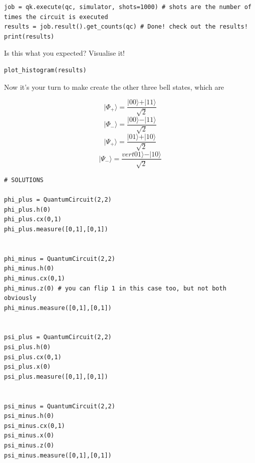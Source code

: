 \documentclass{beamer}
\begin{document}
\begin{frame}
\begin{verbatim}
job = qk.execute(qc, simulator, shots=1000) # shots are the number of times the circuit is executed
results = job.result().get_counts(qc) # Done! check out the results!
print(results)

\end{verbatim}

Is this what you expected? Visualise it!


\begin{verbatim}
plot_histogram(results)

\end{verbatim}


Now it's your turn to make create the other three bell states, which are

$$ \vert \Phi_+\rangle = \frac{\vert00\rangle + \vert11\rangle}{\sqrt{2}} $$
$$ \vert \Phi_-\rangle = \frac{\vert00\rangle - \vert11\rangle}{\sqrt{2}} $$
$$ \vert \Psi_+\rangle = \frac{\vert01\rangle + \vert10\rangle}{\sqrt{2}} $$
$$ \vert \Psi_-\rangle = \frac{vert01\rangle - \vert10\rangle}{\sqrt{2}} $$

































\begin{verbatim}
# SOLUTIONS

phi_plus = QuantumCircuit(2,2)
phi_plus.h(0)
phi_plus.cx(0,1)
phi_plus.measure([0,1],[0,1])


phi_minus = QuantumCircuit(2,2)
phi_minus.h(0)
phi_minus.cx(0,1)
phi_minus.z(0) # you can flip 1 in this case too, but not both obviously
phi_minus.measure([0,1],[0,1])


psi_plus = QuantumCircuit(2,2)
psi_plus.h(0)
psi_plus.cx(0,1)
psi_plus.x(0) 
psi_plus.measure([0,1],[0,1])


psi_minus = QuantumCircuit(2,2)
psi_minus.h(0)
psi_minus.cx(0,1)
psi_minus.x(0)
psi_minus.z(0)
psi_minus.measure([0,1],[0,1])



\end{verbatim}
\end{frame}
\end{document}
